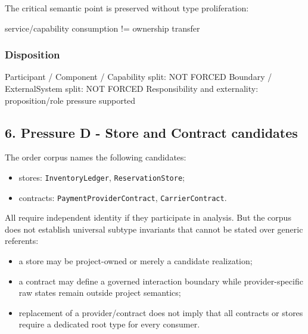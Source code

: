 \documentclass[
  10pt,
]{article}
\newenvironment{Shaded}{}{}
\newcommand{\NormalTok}[1]{#1}
\providecommand{\tightlist}{%
  \setlength{\itemsep}{0pt}\setlength{\parskip}{0pt}}
\begin{document}
The critical semantic point is preserved without type proliferation:

\begin{Shaded}
\begin{Highlighting}[]
\NormalTok{service/capability consumption}
\NormalTok{        !=}
\NormalTok{ownership transfer}
\end{Highlighting}
\end{Shaded}

\subsubsection{Disposition}\label{disposition-2}

\begin{Shaded}
\begin{Highlighting}[]
\NormalTok{Participant / Component / Capability split: NOT FORCED}
\NormalTok{Boundary / ExternalSystem split: NOT FORCED}
\NormalTok{Responsibility and externality: proposition/role pressure supported}
\end{Highlighting}
\end{Shaded}

\subsection{6. Pressure D - Store and Contract
candidates}\label{pressure-d---store-and-contract-candidates}

The order corpus names the following candidates:

\begin{itemize}
\tightlist
\item
  stores: \texttt{InventoryLedger}, \texttt{ReservationStore};
\item
  contracts: \texttt{PaymentProviderContract}, \texttt{CarrierContract}.
\end{itemize}

All require independent identity if they participate in analysis. But
the corpus does not establish universal subtype invariants that cannot
be stated over generic referents:

\begin{itemize}
\tightlist
\item
  a store may be project-owned or merely a candidate realization;
\item
  a contract may define a governed interaction boundary while
  provider-specific raw states remain outside project semantics;
\item
  replacement of a provider/contract does not imply that all contracts
  or stores require a dedicated root type for every consumer.
\end{itemize}
\end{document}
